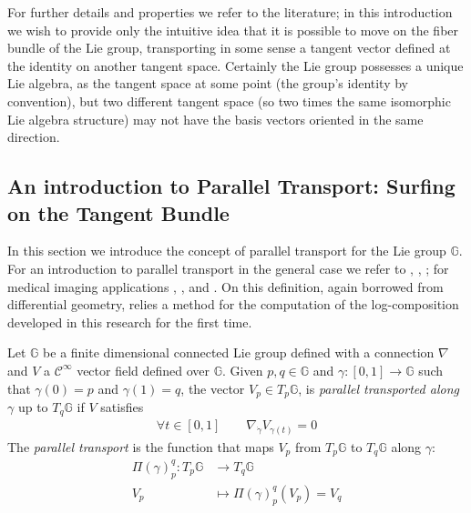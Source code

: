 For further details and properties we refer to the literature; in this introduction we wish to provide only the intuitive idea that it is possible to move on the fiber bundle of the Lie group, transporting in some sense a tangent vector defined at the identity on another tangent space. Certainly the Lie group possesses a unique Lie algebra, as the tangent space at some point (the group's identity by convention), but two different tangent space (so two times the same isomorphic Lie algebra structure) may not have the basis vectors oriented in the same direction. 

\subsection{An introduction to Parallel Transport: Surfing on the Tangent Bundle}\label{se:parallel_transport}

In this section we introduce the concept of parallel transport for the Lie group $\mathbb{G}$. 
For an introduction to parallel transport in the general case we refer to \cite{misner1973gravitation}, \cite{knebelman1951spaces}, \cite{kheyfets2000schild}; for medical imaging applications \cite{lorenzi2011schild}, \cite{pennec2011parallel}, \cite{lorenzi2013geodesics} and \cite{lorenzi2014efficient}.
On this definition, again borrowed from differential geometry, relies a method for the computation of the log-composition developed in this research for the first time.
\begin{definition}
	Let $\mathbb{G}$ be a finite dimensional connected Lie group defined with a connection $\nabla$ and $V$ a $\mathcal{C}^{\infty}$ vector field defined over $\mathbb{G}$. Given $p,q \in \mathbb{G}$ and $\gamma : [0,1] \rightarrow \mathbb{G}$ such that $\gamma(0) = p$ and $\gamma(1) = q$, the vector $V_{p} \in T_{p}\mathbb{G}$, is \emph{parallel transported along $\gamma$} up to $T_{q}\mathbb{G}$ if $V$ satisfies
	\begin{align*}
	\forall t \in  [0,1]
	\qquad
	\nabla_{\dot{\gamma}}V_{\gamma(t)} = 0
	\end{align*}
	The \emph{parallel transport} is the function that maps $V_{p}$ from $T_{p}\mathbb{G}$ to $T_{q}\mathbb{G}$ along $\gamma$:
	\begin{align*}
	\Pi(\gamma)_{p}^{q} :  T_{p}\mathbb{G} & \longrightarrow T_{q}\mathbb{G}  \\
	V_{p}&\longmapsto \Pi(\gamma)_{p}^{q}(V_{p}) = V_{q}
	\end{align*}
\end{definition}

